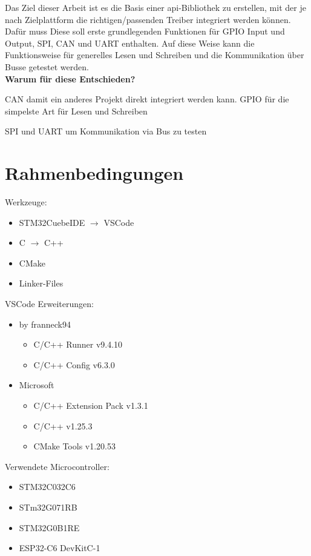 Das Ziel dieser Arbeit ist es die Basis einer \gls{api}-Bibliothek zu erstellen, mit der je nach Zielplattform die richtigen/passenden Treiber integriert werden können.
Dafür muss 
Diese soll erste grundlegenden Funktionen für GPIO Input und Output, SPI, CAN und UART enthalten. 
Auf diese Weise kann die Funktionsweise für generelles Lesen und Schreiben und die Kommunikation über Busse getestet werden.
\\

\textbf{Warum für diese Entschieden?}

CAN damit ein anderes Projekt direkt integriert werden kann.
GPIO für die simpelste Art für Lesen und Schreiben

SPI und UART um Kommunikation via Bus zu testen




\section{Rahmenbedingungen}
Werkzeuge:
\begin{itemize}
	\item STM32CuebeIDE $\rightarrow$ VSCode
	\item C $\rightarrow$ C++
	\item CMake
	\item Linker-Files
\end{itemize}

VSCode Erweiterungen:
\begin{itemize}
	\item by franneck94
	\begin{itemize}
		\item C/C++ Runner v9.4.10
		\item C/C++ Config v6.3.0
	\end{itemize}
	\item Microsoft
	\begin{itemize}
		\item C/C++ Extension Pack v1.3.1
		\item C/C++ v1.25.3
		\item CMake Tools v1.20.53
	\end{itemize}
\end{itemize}

Verwendete Microcontroller:
\begin{itemize}
	\item STM32C032C6
	\item STm32G071RB
	\item STM32G0B1RE
	\item ESP32-C6 DevKitC-1
\end{itemize}


